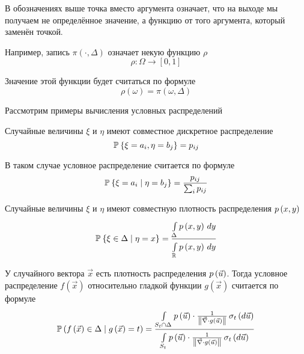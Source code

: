 \begin{remark}
    В обозначениях выше точка вместо аргумента означает,
    что на выходе мы получаем не определённое значение,
    а функцию от того аргумента, который заменён точкой.

    Например, запись $\pi\left( \cdot, \Delta \right)$
    означает некую функцию $\rho$
        $$\rho: \Omega \rightarrow \left[ 0, 1 \right]$$

    Значение этой функции будет считаться по формуле
        $$\rho\left( \omega \right) = \pi\left( \omega, \Delta \right)$$
\end{remark}

Рассмотрим примеры вычисления условных распределений

\begin{example}
    Случайные величины $\xi$ и $\eta$ имеют совместное дискретное распределение
    $$\Probability{\xi = a_i, \eta = b_j} = p_{ij}$$

    В таком случае условное распределение считается по формуле
    \begin{align*}
        \Probability{\xi = a_i \mcond \eta = b_j}
        = \frac{p_{ij}}{\sum_i p_{ij}}
    \end{align*}
\end{example}

\begin{example}
    Случайные величины $\xi$ и $\eta$ имеют
    совместную плотность распределения $\pdf{x,y}$
    \begin{align*}
        \Probability{\xi \in \Delta \mcond \eta = x}
        = \frac{\integral{\Delta}{}{y}{\pdf{x,y}}}
                {\integral{\mathbb{R}}{}{y}{\pdf{x,y}}}
    \end{align*}
\end{example}

\begin{example}
    У случайного вектора $\vec{x}$ есть плотность распределения $\pdf{\vec{u}}$.
    Тогда условное распределение $f\left( \vec{x} \right)$ относительно
    гладкой функции $g\left( \vec{x} \right)$ считается по формуле
    $$\probability{f\left( \vec{x} \right) \in \Delta
        \mcond g\left( \vec{x} \right) = t}
        = \frac{\integrall{S_t \cap \Delta}{\sigma_{t}\left(d\vec{u} \right)}{
            \pdf{\vec{u}} \cdot \frac{1}{
                \left\| \vec{\nabla} \cdot g\left( \vec{u} \right) \right\|}}}
            {\integrall{S_t}{\sigma_{t}\left(d\vec{u} \right)}{
                \pdf{\vec{u}} \cdot \frac{1}{
                    \left\| \vec{\nabla}
                        \cdot g\left( \vec{u} \right) \right\|}}}$$
\end{example}

